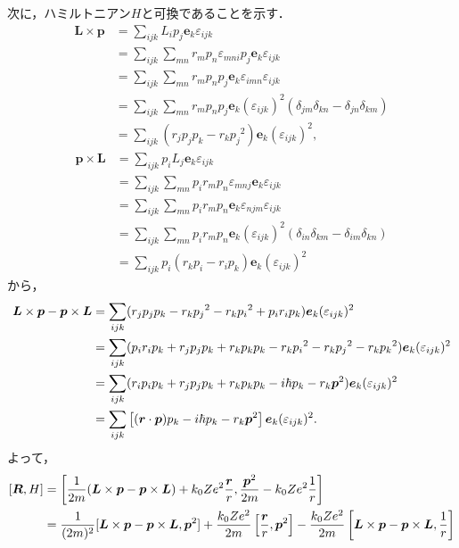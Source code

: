 次に，ハミルトニアン$H$と可換であることを示す．
\begin{align*}
  \boldsymbol{L}\times\boldsymbol{p}
  & = \sum_{ijk}L_ip_j\boldsymbol{e}_k\varepsilon_{ijk}\\
  & = \sum_{ijk}\sum_{mn}r_mp_n\varepsilon_{mni}p_j\boldsymbol{e}_k\varepsilon_{ijk}\\
  & = \sum_{ijk}\sum_{mn}r_mp_np_j\boldsymbol{e}_k\varepsilon_{imn}\varepsilon_{ijk}\\
  & = \sum_{ijk}\sum_{mn}r_mp_np_j\boldsymbol{e}_k(\varepsilon_{ijk})^2(\delta_{jm}\delta_{kn} - \delta_{jn}\delta_{km})\\
  & = \sum_{ijk}(r_jp_jp_k - r_kp_j{}^2)\boldsymbol{e}_k(\varepsilon_{ijk})^2,
\end{align*}
\begin{align*}
  \boldsymbol{p}\times\boldsymbol{L}
  & = \sum_{ijk}p_iL_j\boldsymbol{e}_k\varepsilon_{ijk}\\
  & = \sum_{ijk}\sum_{mn}p_ir_mp_n\varepsilon_{mnj}\boldsymbol{e}_k\varepsilon_{ijk}\\
  & = \sum_{ijk}\sum_{mn}p_ir_mp_n\boldsymbol{e}_k\varepsilon_{njm}\varepsilon_{ijk}\\
  & = \sum_{ijk}\sum_{mn}p_ir_mp_n\boldsymbol{e}_k(\varepsilon_{ijk})^2(\delta_{in}\delta_{km} - \delta_{im}\delta_{kn})\\
  & = \sum_{ijk}p_i(r_kp_i - r_ip_k)\boldsymbol{e}_k(\varepsilon_{ijk})^2
\end{align*}
から，
\begin{align}
  \boldsymbol{L}\times\boldsymbol{p} - \boldsymbol{p}\times\boldsymbol{L}
  & = \sum_{ijk}(r_jp_jp_k - r_kp_j{}^2 - r_kp_i{}^2 + p_ir_ip_k)\boldsymbol{e}_k(\varepsilon_{ijk})^2\notag\\
  & = \sum_{ijk}(p_ir_ip_k + r_jp_jp_k + r_kp_kp_k - r_kp_i{}^2 - r_kp_j{}^2 - r_kp_k{}^2)\boldsymbol{e}_k(\varepsilon_{ijk})^2\notag\\
  & = \sum_{ijk}(r_ip_ip_k + r_jp_jp_k + r_kp_kp_k - i\hbar p_k - r_k\boldsymbol{p}^2)\boldsymbol{e}_k(\varepsilon_{ijk})^2\notag\\
  & = \sum_{ijk}\left[(\boldsymbol{r}\cdot\boldsymbol{p})p_k - i\hbar p_k - r_k\boldsymbol{p}^2\right]\boldsymbol{e}_k(\varepsilon_{ijk})^2.\label{Lp-pL}
\end{align}
よって，
\begin{align}
  \left[\boldsymbol{R},H\right]
  & = \left[\frac{1}{2m}(\boldsymbol{L}\times\boldsymbol{p} - \boldsymbol{p}\times\boldsymbol{L}) + k_0Ze^2\frac{\boldsymbol{r}}{r},\frac{\boldsymbol{p}^2}{2m} - k_0Ze^2\frac{1}{r}\right]\notag\\
  & = \frac{1}{(2m)^2}[\boldsymbol{L}\times\boldsymbol{p} - \boldsymbol{p}\times\boldsymbol{L},\boldsymbol{p}^2] + \frac{k_0Ze^2}{2m}\left[\frac{\boldsymbol{r}}{r},\boldsymbol{p}^2\right] - \frac{k_0Ze^2}{2m}\left[\boldsymbol{L}\times\boldsymbol{p} - \boldsymbol{p}\times\boldsymbol{L},\frac{1}{r}\right]\label{RH}
\end{align}
